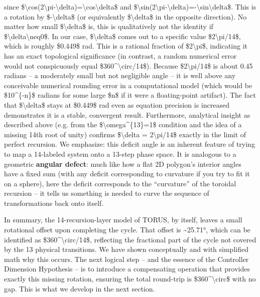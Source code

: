 \documentclass[
]{article}
\begin{document}
since
\$\textbackslash cos(2\textbackslash pi-\textbackslash delta)=\textbackslash cos\textbackslash delta\$
and
\$\textbackslash sin(2\textbackslash pi-\textbackslash delta)=-\textbackslash sin\textbackslash delta\$.
This is a rotation by \$-\textbackslash delta\$ (or equivalently
\$\textbackslash delta\$ in the opposite direction). No matter how small
\$\textbackslash delta\$ is, this is qualitatively not the identity if
\$\textbackslash delta\textbackslash neq0\$. In our case,
\$\textbackslash delta\$ comes out to a specific value
\$2\textbackslash pi/14\$, which is roughly \$0.449\$ rad. This is a
rational fraction of \$2\textbackslash pi\$, indicating it has an exact
topological significance (in contrast, a random numerical error would
not conspicuously equal \$360\^{}\textbackslash circ/14\$). Because
\$2\textbackslash pi/14\$ is about 0.45 radians -- a moderately small
but not negligible angle -- it is well above any conceivable numerical
rounding error in a computational model (which would be \$10\^{}\{-n\}\$
radians for some large \$n\$ if it were a floating-point artifact). The
fact that \$\textbackslash delta\$ stays at \$0.449\$ rad even as
equation precision is increased demonstrates it is a stable, convergent
result. Furthermore, analytical insight as described above (e.g. from
the \$\textbackslash omega\^{}\{13\}=1\$ condition and the idea of a
missing 14th root of unity) confirms \$\textbackslash delta =
2\textbackslash pi/14\$ exactly in the limit of perfect recursion. We
emphasize: this deficit angle is an inherent feature of trying to map a
14-labeled system onto a 13-step phase space. It is analogous to a
geometric \textbf{angular defect}: much like how a flat 2D polygon's
interior angles have a fixed sum (with any deficit corresponding to
curvature if you try to fit it on a sphere), here the deficit
corresponds to the ``curvature'' of the toroidal recursion -- it tells
us something is needed to curve the sequence of transformations back
onto itself.

In summary, the 14-recursion-layer model of TORUS, by itself, leaves a
small rotational offset upon completing the cycle. That offset is
\textasciitilde25.71°, which can be identified as
\$360\^{}\textbackslash circ/14\$, reflecting the fractional part of the
cycle not covered by the 13 physical transitions. We have shown
conceptually and with simplified math why this occurs. The next logical
step -- and the essence of the Controller Dimension Hypothesis -- is to
introduce a compensating operation that provides exactly this missing
rotation, ensuring the total round-trip is
\$360\^{}\textbackslash circ\$ with no gap. This is what we develop in
the next section.
\end{document}
